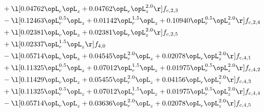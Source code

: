 \begin{alignat}{2}
& + \l[  0.04762 \opL_r \opL_z +  0.04762 \opL_r \opL_z^{2.0}  \r] f_{c,2,3} \nonumber \\ 
& - \l[  0.12463 \opL_r^{0.5} \opL_z +  0.01142 \opL_r^{1.5} \opL_z +  0.10940 \opL_r^{0.5} \opL_z^{2.0}  \r] f_{c,2,4} \nonumber \\ 
& + \l[  0.02381 \opL_r \opL_z +  0.02381 \opL_r \opL_z^{2.0}  \r] f_{c,2,5} \nonumber \\ 
& + \l[  0.02337 \opL_r^{1.5} \opL_z  \r] f_{4,0} \nonumber \\ 
& - \l[  0.05714 \opL_r \opL_z +  0.04545 \opL_r^{2.0} \opL_z +  0.02078 \opL_r \opL_z^{2.0}  \r] f_{c,4,1} \nonumber \\ 
& + \l[  0.11325 \opL_r^{0.5} \opL_z +  0.07012 \opL_r^{1.5} \opL_z +  0.01975 \opL_r^{0.5} \opL_z^{2.0}  \r] f_{c,4,2} \nonumber \\ 
& - \l[  0.11429 \opL_r \opL_z +  0.05455 \opL_r^{2.0} \opL_z +  0.04156 \opL_r \opL_z^{2.0}  \r] f_{c,4,3} \nonumber \\ 
& + \l[  0.11325 \opL_r^{0.5} \opL_z +  0.07012 \opL_r^{1.5} \opL_z +  0.01975 \opL_r^{0.5} \opL_z^{2.0}  \r] f_{c,4,4} \nonumber \\ 
& - \l[  0.05714 \opL_r \opL_z +  0.03636 \opL_r^{2.0} \opL_z +  0.02078 \opL_r \opL_z^{2.0}  \r] f_{c,4,5} \nonumber \\ 
\end{alignat} 


